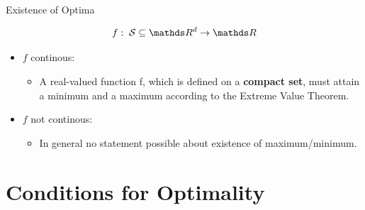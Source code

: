   
  \begin{vbframe}{Existence of Optima}
  
  $$
  f: \; \mathcal{S} \subseteq \R^d \to \R
  $$
  
  \begin{itemize}
  \item $f$ continous:
  \begin{itemize}
  \item A real-valued function f, which is defined on a \textbf{compact set}, must attain a minimum and a maximum according to the Extreme Value Theorem.
  \end{itemize}
  \item $f$ not continous:
  \begin{itemize}
  \item In general no statement possible about existence of maximum/minimum.
  \end{itemize}
  \end{itemize}
  
  
  \end{vbframe}
  
  \section{Conditions for Optimality}
  
